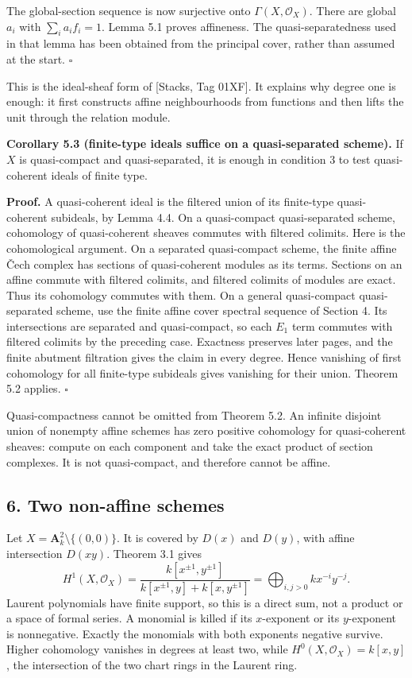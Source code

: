 \documentclass[11pt]{article}
\begin{document}
The global-section sequence is now surjective onto
\(\Gamma(X,\mathcal O_X)\). There are global \(a_i\) with
\(\sum_i a_i f_i=1\). Lemma 5.1 proves affineness. The
quasi-separatedness used in that lemma has been obtained from the
principal cover, rather than assumed at the start. \(\square\)

This is the ideal-sheaf form of {[}Stacks, Tag 01XF{]}. It explains why
degree one is enough: it first constructs affine neighbourhoods from
functions and then lifts the unit through the relation module.

\textbf{Corollary 5.3 (finite-type ideals suffice on a quasi-separated
scheme).} If \(X\) is quasi-compact and quasi-separated, it is enough in
condition 3 to test quasi-coherent ideals of finite type.

\textbf{Proof.} A quasi-coherent ideal is the filtered union of its
finite-type quasi-coherent subideals, by Lemma 4.4. On a quasi-compact
quasi-separated scheme, cohomology of quasi-coherent sheaves commutes
with filtered colimits. Here is the cohomological argument. On a
separated quasi-compact scheme, the finite affine Čech complex has
sections of quasi-coherent modules as its terms. Sections on an affine
commute with filtered colimits, and filtered colimits of modules are
exact. Thus its cohomology commutes with them. On a general
quasi-compact quasi-separated scheme, use the finite affine cover
spectral sequence of Section 4. Its intersections are separated and
quasi-compact, so each \(E_1\) term commutes with filtered colimits by
the preceding case. Exactness preserves later pages, and the finite
abutment filtration gives the claim in every degree. Hence vanishing of
first cohomology for all finite-type subideals gives vanishing for their
union. Theorem 5.2 applies. \(\square\)

Quasi-compactness cannot be omitted from Theorem 5.2. An infinite
disjoint union of nonempty affine schemes has zero positive cohomology
for quasi-coherent sheaves: compute on each component and take the exact
product of section complexes. It is not quasi-compact, and therefore
cannot be affine.

\subsection{6. Two non-affine schemes}\label{two-non-affine-schemes}

Let \(X=\mathbf A_k^2\setminus\{(0,0)\}\). It is covered by \(D(x)\) and
\(D(y)\), with affine intersection \(D(xy)\). Theorem 3.1 gives \[
H^1(X,\mathcal O_X)
=\frac{k[x^{\pm1},y^{\pm1}]}{k[x^{\pm1},y]+k[x,y^{\pm1}]}
=\bigoplus_{i,j>0}k x^{-i}y^{-j}.
\] Laurent polynomials have finite support, so this is a direct sum, not
a product or a space of formal series. A monomial is killed if its
\(x\)-exponent or its \(y\)-exponent is nonnegative. Exactly the
monomials with both exponents negative survive. Higher cohomology
vanishes in degrees at least two, while \(H^0(X,\mathcal O_X)=k[x,y]\),
the intersection of the two chart rings in the Laurent ring.
\end{document}
